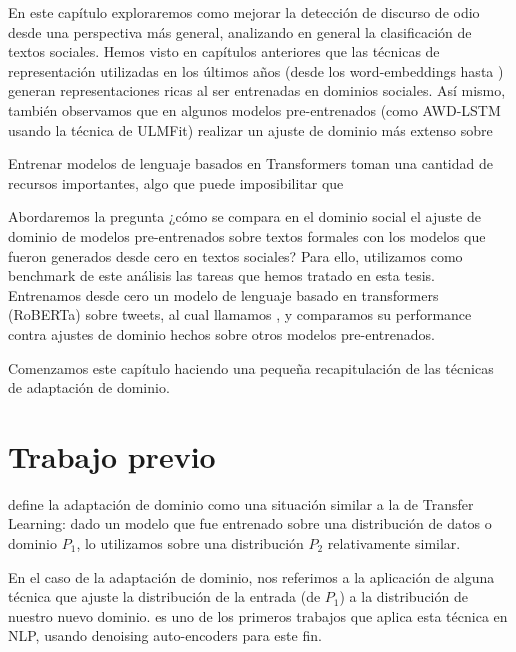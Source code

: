 
\newcommand{\deacc}[0]{\textbf{deacc}}
\newcommand{\cased}[0]{\textbf{cased}}
\newcommand{\uncased}[0]{\textbf{uncased}}

En este capítulo exploraremos como mejorar la detección de discurso de odio desde una perspectiva más general, analizando en general la clasificación de textos sociales. Hemos visto en capítulos anteriores que las técnicas de representación utilizadas en los últimos años (desde los word-embeddings hasta ) generan representaciones ricas al ser entrenadas en dominios sociales. Así mismo, también observamos que en algunos modelos pre-entrenados (como AWD-LSTM usando la técnica de ULMFit)  realizar un ajuste de dominio más extenso sobre

Entrenar modelos de lenguaje basados en Transformers toman una cantidad de recursos importantes, algo que puede imposibilitar que

Abordaremos la pregunta ¿cómo se compara en el dominio social el ajuste de dominio de modelos pre-entrenados sobre textos formales con los modelos que fueron generados desde cero en textos sociales? Para ello, utilizamos como benchmark de este análisis las tareas que hemos tratado en esta tesis. Entrenamos desde cero un modelo de lenguaje basado en transformers (RoBERTa)\cite{liu2019roberta} sobre tweets, al cual llamamos \robertuito{}, y comparamos su performance contra ajustes de dominio hechos sobre otros modelos pre-entrenados.

Comenzamos este capítulo haciendo una pequeña recapitulación de las técnicas de adaptación de dominio.

\section{Trabajo previo}
\label{sec:domain_adaptation_previous_work}

\citet{goodfellow2016deep} define la adaptación de dominio como una situación similar a la de Transfer Learning: dado un modelo que fue entrenado sobre una distribución de datos o dominio $P_1$, lo utilizamos sobre una distribución $P_2$ relativamente similar.

En el caso de la adaptación de dominio, nos referimos a la aplicación de alguna técnica que ajuste la distribución de la entrada (de $P_1$) a la distribución de nuestro nuevo dominio. \citet{glorot2011domain} es uno de los primeros trabajos que aplica esta técnica en NLP, usando denoising auto-encoders para este fin. 

